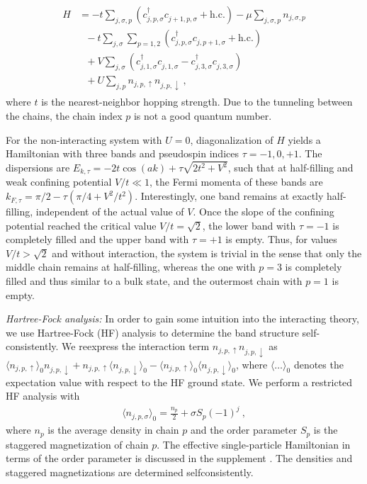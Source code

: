 \documentclass[twocolumn, prl, aps, floatfix, superscriptaddress, longbibliography]{revtex4-1}
\begin{document}
%
\begin{align} \label{eq:CoupledChainsHamiltonian}
	\begin{split}
		H &= -t\sum_{j,\sigma,p} \left(c^{\dagger}_{j,p,\sigma}c^{\phantom{\dagger}}_{j+1,p,\sigma} + \text{h.c.}\right) - \mu \sum_{j,\sigma,p} n_{j,\sigma,p}\\
		&\ \ \ - t \sum_{j,\sigma} \sum_{p=1,2} \left(c^{\dagger}_{j,p,\sigma}c^{\phantom{\dagger}}_{j,p+1,\sigma} + \text{h.c.}\right) \\
		&\ \ \ + V\sum_{j,\sigma} \left(c^{\dagger}_{j,1,\sigma} c^{\phantom{\dagger}}_{j,1,\sigma} - c^{\dagger}_{j,3,\sigma} c^{\phantom{\dagger}}_{j,3,\sigma}\right) \\
		&\ \ \ + U\sum_{j,p} n_{j,p,\uparrow}n_{j,p,\downarrow} \ ,
	\end{split}
\end{align}
% 
where $t$ is the nearest-neighbor hopping strength. Due to the tunneling between the chains, the chain index $p$ is not  a good quantum number.

For the non-interacting system with $U=0$, diagonalization of $H$ yields a Hamiltonian with three bands and pseudospin indices $\tau = -1,0,+1$. The dispersions are $E_{k,\tau} = -2t\cos(ak) + \tau\sqrt{2t^2 + V^2}$, such that  at half-filling and weak confining potential $V/t\ll 1$, the Fermi momenta of these bands are $k_{F,\tau} = \pi/2 -\tau(\pi/4+V^2/t^2)$. Interestingly, one band remains at exactly half-filling, independent of the actual value of $V$. Once the slope of the confining potential reached the critical value $V/t=\sqrt{2}$, the lower band with $\tau = -1$ is completely filled and the upper band with $\tau=+1$ is empty. Thus, for values $V/t>\sqrt{2}$ and without interaction, the system is trivial in the sense that only the middle chain remains at half-filling, whereas the one with $p=3$ is completely filled and thus similar to a bulk state, and the outermost chain with $p=1$ is empty.

\noindent \textit{Hartree-Fock analysis:} In order to gain some intuition into the interacting theory, we use Hartree-Fock (HF) analysis to determine the band structure self-consistently. We reexpress the interaction term $n_{j,p,\uparrow} n_{j,p,\downarrow}$ as $ \langle  n_{j,p,\uparrow} \rangle_0  n_{j,p,\downarrow} +   n_{j,p,\uparrow}  \langle n_{j,p,\downarrow}\rangle_0 -  \langle n_{j,p,\uparrow}\rangle_0  \langle n_{j,p,\downarrow}\rangle_0$, where $\langle\dots \rangle_0$ denotes the expectation value with respect to the HF ground state. We perform a restricted HF analysis with
%
\begin{align}
	\langle n_{j,p,\sigma} \rangle_0  = \frac{n_p}{2} + \sigma S_p(-1)^j \ ,
\end{align}
%
where $n_p$ is the average density in chain $p$ and the order parameter $S_p$ is the staggered magnetization of chain $p$. The effective single-particle Hamiltonian in terms of the order parameter is discussed in the supplement \cite{supp}. The densities and staggered magnetizations are determined selfconsistently. 
\end{document}
